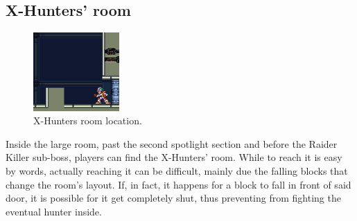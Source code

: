 \subsection{X-Hunters' room}
\begin{figure}[htp]
	\centering
	\includegraphics[height=3cm]{figures/X2/Magna_centipede/Centipede_Hunter_room.png}
	\caption{X-Hunters room location.}
\end{figure}
Inside the large room, past the second spotlight section and before the Raider Killer sub-boss, players can find  the X-Hunters' room. While to reach it is easy by words, actually reaching it can be difficult, mainly due the falling blocks that change the room's layout. If, in fact, it happens for a block to fall in front of said door, it is possible for it get completely shut, thus preventing from fighting the eventual hunter inside. 

